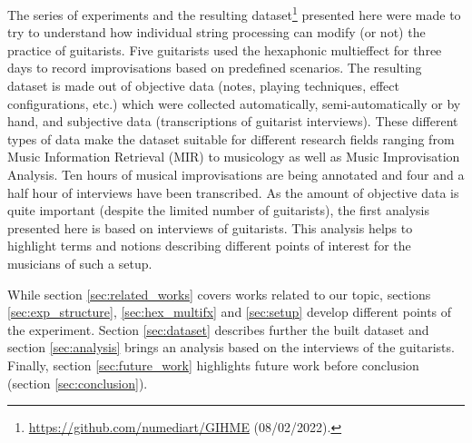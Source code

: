 \documentclass{article}
\begin{document}
The series of experiments and the resulting dataset\footnote{\url{https://github.com/numediart/GIHME} (08/02/2022).} presented here were made to try to understand how individual string processing can modify (or not) the practice of guitarists.  Five guitarists used the hexaphonic multieffect for three days to record improvisations based on predefined scenarios.
The resulting dataset is made out of objective data (notes, playing techniques, effect configurations, etc.) which were collected automatically, semi-automatically or by hand, and subjective data (transcriptions of guitarist interviews).  These different types of data make the dataset suitable for different research fields ranging from Music Information Retrieval (MIR) to musicology as well as Music Improvisation Analysis. Ten hours of musical improvisations are being annotated and four and a half hour of interviews have been transcribed. As the amount of objective data is quite important (despite the limited number of guitarists), the first analysis presented here is based on interviews of guitarists. This analysis helps to highlight terms and notions describing different points of interest for the musicians of such a setup. 



While section \ref{sec:related_works} covers works related to our topic, sections \ref{sec:exp_structure}, \ref{sec:hex_multifx} and \ref{sec:setup} develop different points of the experiment. Section \ref{sec:dataset} describes further the built dataset and section \ref{sec:analysis} brings an analysis based on the interviews of the guitarists.
Finally, section \ref{sec:future_work} highlights future work before conclusion (section \ref{sec:conclusion}).

\end{document}
